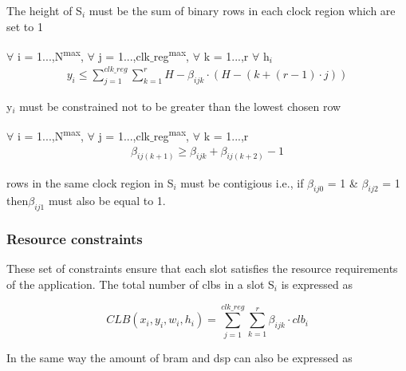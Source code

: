 \begin{defn}
The height of S$_i$ must be the sum of binary rows in each clock region which are set to 1
\end{defn}

\begin{constraint} $\forall$ i = 1...,N\textsuperscript{max}, $\forall$ j = 1...,clk$\_$reg\textsuperscript{max}, $\forall$ k = 1...,r $\forall$ h$_i$
\begin{equation}
\begin{split}
y_i \leq \sum_{j=1}^{clk\_reg} \sum_{k=1}^{r} H - \beta_{ijk} \cdot (H - (k + (r - 1) \cdot j))
\end{split}
\end{equation}
\end{constraint}
\begin{defn}
y$_i$ must be constrained not to be greater than the lowest chosen row 
\end{defn}


\begin{constraint} $\forall$ i = 1...,N\textsuperscript{max}, $\forall$ j = 1...,clk$\_$reg\textsuperscript{max}, $\forall$ k = 1...,r
\begin{equation}
\begin{split}
\beta_{ij(k+1)} \geq \beta_{ijk} + \beta_{ij(k+2)} - 1 
\end{split}
\end{equation}
\end{constraint}

\begin{defn}
rows in the same clock region in S$_i$ must be contigious i.e., if $\beta_{ij0}$ = 1 \& $\beta_{ij2}$ = 1 then$\beta_{ij1}$ must also be equal to 1.
\end{defn}


\subsubsection{\textbf{Resource constraints}} 
These set of constraints ensure that each slot satisfies the resource requirements of the application. The total number of clbs in a slot S$_i$ is expressed as 

\begin{equation}
CLB(x_i,y_i,w_i,h_i) = \sum_{j=1}^{clk\_reg} \sum_{k=1}^{r} \beta_{ijk} \cdot clb_i 
\label{tot_clb}
\end{equation}

In the same way the amount of bram and dsp can also be expressed as 

